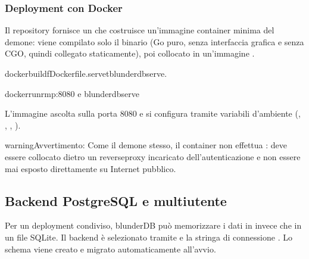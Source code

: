 \documentclass[letterpaper,10pt,italian]{sphinxmanual}
\begin{document}
\subsubsection{Deployment con Docker}
\label{\detokenize{mode_headless:deploiement-avec-docker}}\label{\detokenize{mode_headless:headless-docker}}
\sphinxAtStartPar
Il repository fornisce un  che costruisce un’immagine container minima del demone: viene compilato solo il binario  (Go puro, senza interfaccia grafica e senza CGO, quindi collegato staticamente), poi collocato in un’immagine .

\begin{sphinxVerbatim}[commandchars=\\\{\}]
dockerbuild\PYGZhy{}fDockerfile.serve\PYGZhy{}tblunderdb\PYGZhy{}serve.

dockerrun\PYGZhy{}\PYGZhy{}rm\PYGZhy{}p:8080
\PYGZhy{}e
blunderdb\PYGZhy{}serve
\end{sphinxVerbatim}

\sphinxAtStartPar
L’immagine ascolta sulla porta 8080 e si configura tramite variabili d’ambiente (, , , ).

\begin{sphinxadmonition}{warning}{Avvertimento:}
\sphinxAtStartPar
Come il demone stesso, il container non effettua  : deve essere collocato dietro un reverse\sphinxhyphen{}proxy incaricato dell’autenticazione e non essere mai esposto direttamente su Internet pubblico.
\end{sphinxadmonition}


\subsection{Backend PostgreSQL e multiutente}
\label{\detokenize{mode_headless:backend-postgresql-et-multi-utilisateurs}}\label{\detokenize{mode_headless:headless-postgres}}
\sphinxAtStartPar
Per un deployment condiviso, blunderDB può memorizzare i dati in  invece che in un file SQLite. Il backend è selezionato tramite  e la stringa di connessione . Lo schema viene creato e migrato automaticamente all’avvio.
\end{document}
